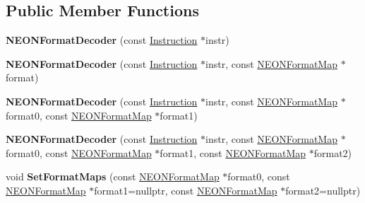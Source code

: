 \subsection*{Public Member Functions}
\begin{DoxyCompactItemize}
\item 
\mbox{\label{classv8_1_1internal_1_1NEONFormatDecoder_a732da8a19ff5909b0ca7c588b4a8963e}} 
{\bfseries N\+E\+O\+N\+Format\+Decoder} (const \mbox{\hyperlink{classv8_1_1internal_1_1Instruction}{Instruction}} $\ast$instr)
\item 
\mbox{\label{classv8_1_1internal_1_1NEONFormatDecoder_aea02daf67ef972b9eecf22e0d6fb1f98}} 
{\bfseries N\+E\+O\+N\+Format\+Decoder} (const \mbox{\hyperlink{classv8_1_1internal_1_1Instruction}{Instruction}} $\ast$instr, const \mbox{\hyperlink{structv8_1_1internal_1_1NEONFormatMap}{N\+E\+O\+N\+Format\+Map}} $\ast$format)
\item 
\mbox{\label{classv8_1_1internal_1_1NEONFormatDecoder_a7549fcc185815f31b7d275bbfeef256a}} 
{\bfseries N\+E\+O\+N\+Format\+Decoder} (const \mbox{\hyperlink{classv8_1_1internal_1_1Instruction}{Instruction}} $\ast$instr, const \mbox{\hyperlink{structv8_1_1internal_1_1NEONFormatMap}{N\+E\+O\+N\+Format\+Map}} $\ast$format0, const \mbox{\hyperlink{structv8_1_1internal_1_1NEONFormatMap}{N\+E\+O\+N\+Format\+Map}} $\ast$format1)
\item 
\mbox{\label{classv8_1_1internal_1_1NEONFormatDecoder_adf58ff7c8e79f40072a7985624b1a65a}} 
{\bfseries N\+E\+O\+N\+Format\+Decoder} (const \mbox{\hyperlink{classv8_1_1internal_1_1Instruction}{Instruction}} $\ast$instr, const \mbox{\hyperlink{structv8_1_1internal_1_1NEONFormatMap}{N\+E\+O\+N\+Format\+Map}} $\ast$format0, const \mbox{\hyperlink{structv8_1_1internal_1_1NEONFormatMap}{N\+E\+O\+N\+Format\+Map}} $\ast$format1, const \mbox{\hyperlink{structv8_1_1internal_1_1NEONFormatMap}{N\+E\+O\+N\+Format\+Map}} $\ast$format2)
\item 
\mbox{\label{classv8_1_1internal_1_1NEONFormatDecoder_a483f12be340a4984e56972180522bf63}} 
void {\bfseries Set\+Format\+Maps} (const \mbox{\hyperlink{structv8_1_1internal_1_1NEONFormatMap}{N\+E\+O\+N\+Format\+Map}} $\ast$format0, const \mbox{\hyperlink{structv8_1_1internal_1_1NEONFormatMap}{N\+E\+O\+N\+Format\+Map}} $\ast$format1=nullptr, const \mbox{\hyperlink{structv8_1_1internal_1_1NEONFormatMap}{N\+E\+O\+N\+Format\+Map}} $\ast$format2=nullptr)

\end{DoxyCompactItemize}
